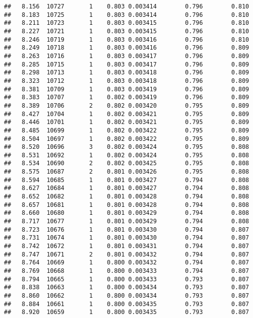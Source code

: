 \documentclass[
]{book}
\begin{document}
\begin{verbatim}
##   8.156  10727       1    0.803 0.003414        0.796        0.810
##   8.183  10725       1    0.803 0.003414        0.796        0.810
##   8.211  10723       1    0.803 0.003415        0.796        0.810
##   8.227  10721       1    0.803 0.003415        0.796        0.810
##   8.246  10719       1    0.803 0.003416        0.796        0.810
##   8.249  10718       1    0.803 0.003416        0.796        0.809
##   8.263  10716       1    0.803 0.003417        0.796        0.809
##   8.285  10715       1    0.803 0.003417        0.796        0.809
##   8.298  10713       1    0.803 0.003418        0.796        0.809
##   8.323  10712       1    0.803 0.003418        0.796        0.809
##   8.381  10709       1    0.803 0.003419        0.796        0.809
##   8.383  10707       1    0.802 0.003419        0.796        0.809
##   8.389  10706       2    0.802 0.003420        0.795        0.809
##   8.427  10704       1    0.802 0.003421        0.795        0.809
##   8.446  10701       1    0.802 0.003421        0.795        0.809
##   8.485  10699       1    0.802 0.003422        0.795        0.809
##   8.504  10697       1    0.802 0.003422        0.795        0.809
##   8.520  10696       3    0.802 0.003424        0.795        0.808
##   8.531  10692       1    0.802 0.003424        0.795        0.808
##   8.534  10690       2    0.802 0.003425        0.795        0.808
##   8.575  10687       2    0.801 0.003426        0.795        0.808
##   8.594  10685       1    0.801 0.003427        0.794        0.808
##   8.627  10684       1    0.801 0.003427        0.794        0.808
##   8.652  10682       1    0.801 0.003428        0.794        0.808
##   8.657  10681       1    0.801 0.003428        0.794        0.808
##   8.660  10680       1    0.801 0.003429        0.794        0.808
##   8.717  10677       1    0.801 0.003429        0.794        0.808
##   8.723  10676       1    0.801 0.003430        0.794        0.807
##   8.731  10674       1    0.801 0.003430        0.794        0.807
##   8.742  10672       1    0.801 0.003431        0.794        0.807
##   8.747  10671       2    0.801 0.003432        0.794        0.807
##   8.764  10669       1    0.800 0.003432        0.794        0.807
##   8.769  10668       1    0.800 0.003433        0.794        0.807
##   8.794  10665       1    0.800 0.003433        0.793        0.807
##   8.838  10663       1    0.800 0.003434        0.793        0.807
##   8.860  10662       1    0.800 0.003434        0.793        0.807
##   8.884  10661       1    0.800 0.003435        0.793        0.807
##   8.920  10659       1    0.800 0.003435        0.793        0.807

\end{verbatim}
\end{document}
